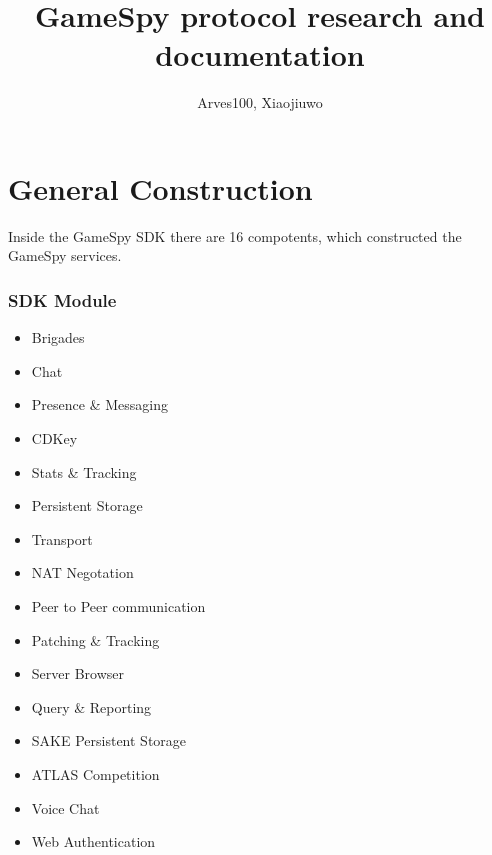 \documentclass[oneside,titlepage,a4paper]{Definition/retrospy} %
\begin{document}
 

\title{\Huge\textbf{GameSpy protocol research and documentation}} 
\author{Arves100, Xiaojiuwo}

\maketitle

\tableofcontents


	
	\chapter{General Construction}
		\par Inside the GameSpy SDK there are 16 compotents, which constructed the GameSpy services.
		\subsection{SDK Module}
		\begin{itemize}
			\item Brigades
			\item Chat
			\item Presence \& Messaging
			\item CDKey
			\item Stats \& Tracking
			\item Persistent Storage
			\item Transport
			\item NAT Negotation
			\item Peer to Peer communication
			\item Patching \& Tracking
			\item Server Browser
			\item Query \& Reporting
			\item SAKE Persistent Storage
			\item ATLAS Competition
			\item Voice Chat
			\item Web Authentication
		\end{itemize}
\end{document}
